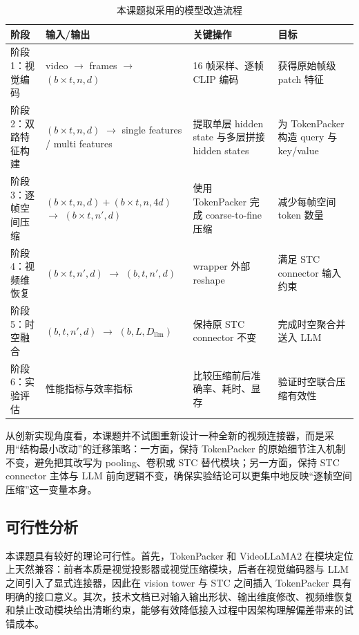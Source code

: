 \begin{table}[H]
    \centering
    \small
    \renewcommand{\arraystretch}{1.15}
    \caption{本课题拟采用的模型改造流程}
    \begin{tabularx}{\textwidth}{p{}p{}XX}
        \toprule
        阶段 & 输入/输出 & 关键操作 & 目标 \\
        \midrule
        阶段1：视觉编码 & video $\to$ frames $\to$ $(b\times t,n,d)$ & 16 帧采样、逐帧 CLIP 编码 & 获得原始帧级 patch 特征 \\
        阶段2：双路特征构建 & $(b\times t,n,d)$ $\to$ single features / multi features & 提取单层 hidden state 与多层拼接 hidden states & 为 TokenPacker 构造 query 与 key/value \\
        阶段3：逐帧空间压缩 & $(b\times t,n,d)+(b\times t,n,4d)$ $\to$ $(b\times t,n',d)$ & 使用 TokenPacker 完成 coarse-to-fine 压缩 & 减少每帧空间 token 数量 \\
        阶段4：视频维恢复 & $(b\times t,n',d)$ $\to$ $(b,t,n',d)$ & wrapper 外部 reshape & 满足 STC connector 输入约束 \\
        阶段5：时空融合 & $(b,t,n',d)$ $\to$ $(b,L,D_{\text{llm}})$ & 保持原 STC connector 不变 & 完成时空聚合并送入 LLM \\
        阶段6：实验评估 & 性能指标与效率指标 & 比较压缩前后准确率、耗时、显存 & 验证时空联合压缩有效性 \\
        \bottomrule
    \end{tabularx}
\end{table}

从创新实现角度看，本课题并不试图重新设计一种全新的视频连接器，而是采用“结构最小改动”的迁移策略：一方面，保持 TokenPacker 的原始细节注入机制不变，避免把其改写为 pooling、卷积或 STC 替代模块；另一方面，保持 STC connector 主体与 LLM 前向逻辑不变，确保实验结论可以更集中地反映“逐帧空间压缩”这一变量本身。

\subsection{可行性分析}

本课题具有较好的理论可行性。首先，TokenPacker 和 VideoLLaMA2 在模块定位上天然兼容：前者本质是视觉投影器或视觉压缩模块，后者在视觉编码器与 LLM 之间引入了显式连接器，因此在 vision tower 与 STC 之间插入 TokenPacker 具有明确的接口意义\cite{tokenpacker2024,videollama22024}。其次，技术文档已对输入输出形状、输出维度修改、视频维恢复和禁止改动模块给出清晰约束，能够有效降低接入过程中因架构理解偏差带来的试错成本。


